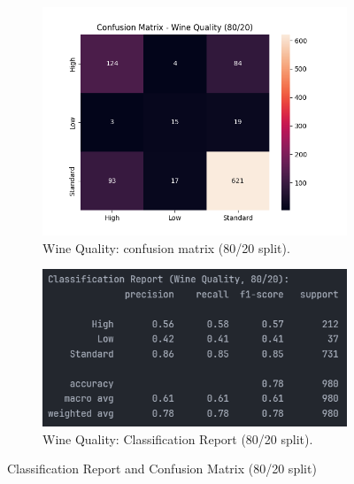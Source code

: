 \begin{figure}[H]
	\centering
	\begin{subfigure}{0.45\textwidth}
		\centering
		\includegraphics[width=\textwidth]{imgs/confusion_mat/confusion_mat__wine_quality__80_vs_20.png}
		\caption{Wine Quality: confusion matrix (80/20 split).}\label{fig:wq-cm-80-20}
	\end{subfigure}
	\hfill
	\begin{subfigure}{0.45\textwidth}
		\centering
		\includegraphics[width=\textwidth]{imgs/confusion_mat/class_rp__wine_quality__80_vs_20.png}
		\caption{Wine Quality: Classification Report (80/20 split).}\label{fig:wq-cr-80-20}
	\end{subfigure}

	\caption{Classification Report and Confusion Matrix (80/20 split)}\label{fig:wq-eval-80-20}
\end{figure}
